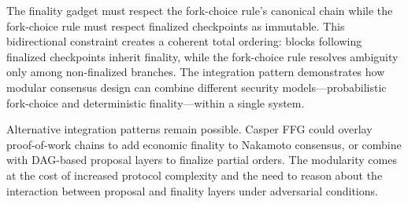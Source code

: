 The finality gadget must respect the fork-choice rule's canonical chain while the fork-choice rule must respect finalized checkpoints as immutable. This bidirectional constraint creates a coherent total ordering: blocks following finalized checkpoints inherit finality, while the fork-choice rule resolves ambiguity only among non-finalized branches. The integration pattern demonstrates how modular consensus design can combine different security models---probabilistic fork-choice and deterministic finality---within a single system.

Alternative integration patterns remain possible. Casper FFG could overlay proof-of-work chains to add economic finality to Nakamoto consensus, or combine with DAG-based proposal layers to finalize partial orders. The modularity comes at the cost of increased protocol complexity and the need to reason about the interaction between proposal and finality layers under adversarial conditions.